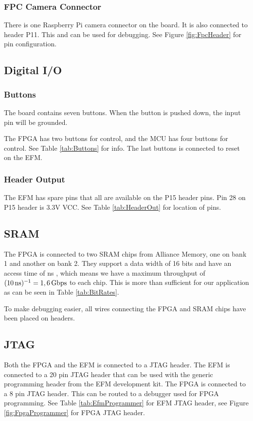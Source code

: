 \subsubsection{FPC Camera Connector}
There is one Raspberry Pi camera connector on the board.
It is also connected to header P11.
This and can be used for debugging.
See Figure \ref{fig:FpcHeader} for pin configuration.

\subsection{Digital I/O}
\subsubsection{Buttons}
The board contains seven buttons.
When the button is pushed down, the input pin will be grounded.

The FPGA has two buttons for control, and the MCU has four buttons for control.
See Table \ref{tab:Buttons} for info.
The last buttons is connected to reset on the EFM.

\subsubsection{Header Output}
The EFM has spare pins that all are available on the P15 header pins.
Pin 28 on P15 header is 3.3V VCC.
See Table \ref{tab:HeaderOut} for location of pins.

\subsection{SRAM}
\label{subsec:sram}
The FPGA is connected to two SRAM chips from Alliance Memory, one on bank 1 and another on bank 2.
They support a data width of 16 bits and have an access time of \unit[10]{ns} \cite{sramdatasheet}, which means we have a maximum throughput of $(\unit[10]{ns})^{-1} = \unit[1,6]{Gbps}$ to each chip.
This is more than sufficient for our application as can be seen in Table \ref{tab:BitRates}.

To make debugging easier, all wires connecting the FPGA and SRAM chips have been placed on headers.

\subsection{JTAG}
Both the FPGA and the EFM is connected to a JTAG header.
The EFM is connected to a 20 pin JTAG header that can be used with the generic programming header from the EFM development kit.
The FPGA is connected to a 8 pin JTAG header. This can be routed to a debugger used for FPGA programming.
See Table \ref{tab:EfmProgrammer} for EFM JTAG header, see Figure \ref{fig:FpgaProgrammer} for FPGA JTAG header.


